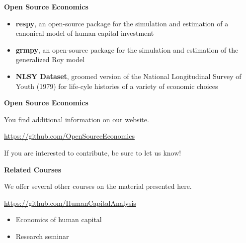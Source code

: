 \begin{frame}\textbf{Open Source Economics}\vspace{0.3cm}

\begin{itemize}\setlength\itemsep{1em}
\item \textbf{respy}, an open-source package for the simulation and estimation of a canonical model of human capital investment
\item \textbf{grmpy}, an open-source package for the simulation and estimation of the generalized Roy model
\item \textbf{NLSY Dataset}, groomed version of the National Longitudinal Survey of Youth (1979) for life-cyle histories of a variety of economic choices
\end{itemize}

\end{frame}
\begin{frame}
	\textbf{Open Source Economics}\vspace{0.3cm}

You find additional information on our website.

\begin{center}
\url{https://github.com/OpenSourceEconomics}
\end{center}

If you are interested to contribute, be sure to let us know!

\end{frame}
\begin{frame}
	\textbf{Related Courses}\vspace{0.3cm}

We offer several other courses on the material presented here.

	\begin{center}
	\url{https://github.com/HumanCapitalAnalysis}
	\end{center}


	\begin{itemize}\setlength\itemsep{1em}
	\item Economics of human capital
	\item Research seminar
	\end{itemize}

\end{frame}
